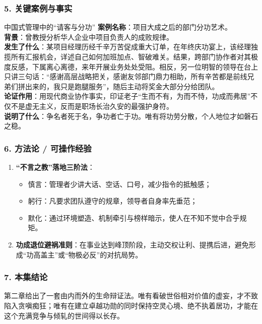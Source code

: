 \subsubsection{5. 关键案例与事实}
\begin{CaseBox}{中国式管理中的“请客与分功”}
\textbf{案例名称}：项目大成之后的部门分功艺术。\\
\textbf{背景}：曾教授分析华人企业中项目负责人的成败规律。\\
\textbf{发生了什么}：某项目经理历经千辛万苦促成重大订单，在年终庆功宴上，该经理独揽所有汇报机会，详述自己如何加班加点、智破难关。结果，跨部门协作者对其极度反感，下属离心离德，来年开展业务处处受阻。相反，另一位明智的领导在台上只讲三句话：“感谢高层战略把关，感谢友邻部门鼎力相助，所有辛苦都是前线兄弟们拼出来的，我只是跑腿服务”，随后主动将奖金大部分分给团队。\\
\textbf{论证作用}：用现代商业协作事实，印证老子“生而不有，为而不恃，功成而弗居”不仅不是虚无主义，反而是职场长治久安的最强护身符。\\
\textbf{说明了什么}：争名者死于名，争功者亡于功。唯有将功劳分散，个人地位才如磐石之稳。
\end{CaseBox}

\subsubsection{6. 方法论 / 可操作经验}
\begin{enumerate}
    \item \textbf{“不言之教”落地三阶法}：
    \begin{itemize}
        \item 慎言：管理者少讲大话、空话、口号，减少指令的抵触感；
        \item 躬行：凡要求团队遵守的规章，领导者自身率先垂范；
        \item 默化：通过环境塑造、机制牵引与榜样暗示，使人在不知不觉中合乎规矩。
    \end{itemize}
    \item \textbf{功成退位避祸准则}：在事业达到峰顶阶段，主动交权让利、提携后进，避免形成“功高盖主”或“物极必反”的对抗局势。
\end{enumerate}

\subsubsection{7. 本集结论}
第二章给出了一套由内而外的生命辩证法。唯有看破世俗相对价值的虚妄，才不致陷入贪嗔痴狂；唯有在建立卓越功勋的同时保持空灵心境、绝不执着居功，才能在这个充满竞争与倾轧的世间得以长存。

